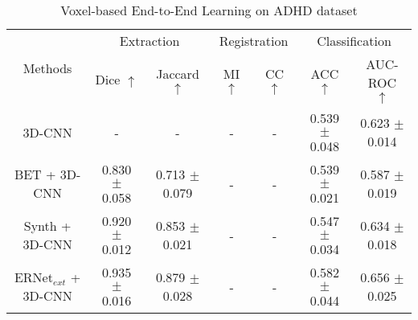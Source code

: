 
\begin{table*}[t]
    \centering
    \caption{Voxel-based End-to-End Learning on ADHD dataset}
    \label{tab:res ADHD 3D-CNN}
    \vspace{-5pt}
    \resizebox{0.69\linewidth}{!}
    {
    \begin{tabular}{ccccccc}
    \toprule
    
    \multicolumn{1}{c}{\multirow{2}{*}{Methods}}              & 
    \multicolumn{2}{c}{Extraction}             &
    \multicolumn{2}{c}{Registration}           &
    \multicolumn{2}{c}{Classification}
    
    \\   
    
    \cmidrule(lr){2-3}
    \cmidrule(lr){4-5}
    \cmidrule(lr){6-7}
    
    
     &
    
    {Dice $\uparrow$} & 
    {Jaccard $\uparrow$} & 
    
    {MI $\uparrow$} &
    {CC $\uparrow$} &

    {ACC $\uparrow$} &
    {AUC-ROC $\uparrow$} 
    

    \\
    
    \midrule
    
    
    3D-CNN &
    - &
    - &
    - &
    - &
    0.539 $\pm$ 0.048 &
    0.623 $\pm$ 0.014

    \\   

    
    BET + 
    3D-CNN &
    0.830 $\pm$ 0.058 &
    0.713 $\pm$ 0.079 &
    - &
    - &
    0.539 $\pm$ 0.021 &
    0.587 $\pm$ 0.019

    \\

    
    Synth + 
    3D-CNN & 
    0.920 $\pm$ 0.012 &
    0.853 $\pm$ 0.021 &
    - &
    - &
    0.547 $\pm$ 0.034 &
    0.634 $\pm$ 0.018

    
    \\

    
    ERNet$_{ext}$ + 
    3D-CNN & 
    0.935 $\pm$ 0.016 &
    0.879 $\pm$ 0.028 &
    - &
    - &
    0.582 $\pm$ 0.044 &
    0.656 $\pm$ 0.025 


\end{tabular}}
\end{table*}
